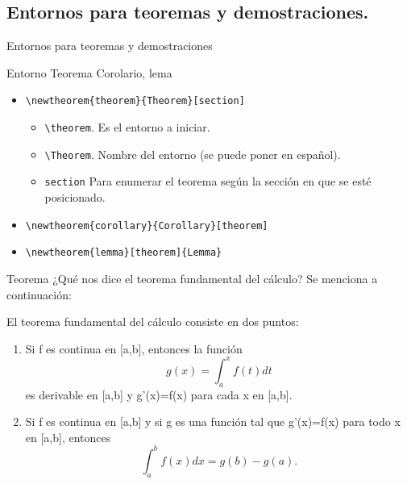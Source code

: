 \documentclass[aspectratio=169, 10pt]{beamer}
\begin{document}
\subsection{Entornos para teoremas y demostraciones.}
\begin{frame}[fragile]{Entornos para teoremas y demostraciones}

\begin{block}{Entorno Teorema Corolario, lema}

    \begin{itemize}
        \item \verb|\newtheorem{theorem}{Theorem}[section]|
        \begin{itemize}
            \item \verb|\theorem|. Es el entorno a iniciar.
            \item \verb|\Theorem|. Nombre del entorno (se puede poner en español).
            \item \verb|section| Para enumerar el teorema según la sección en que se esté posicionado.
        \end{itemize}
        \item \verb|\newtheorem{corollary}{Corollary}[theorem]|
        \item \verb|\newtheorem{lemma}[theorem]{Lemma}|
    \end{itemize}
\end{block}

\end{frame}


\begin{frame}{Teorema}
¿Qué nos dice el teorema fundamental del cálculo? Se menciona a continuación: 

\begin{theorem}
    El teorema fundamental del cálculo consiste en dos puntos: 
    \begin{enumerate}
        \item Si f es continua en [a,b], entonces la función 
        \begin{equation}
            g(x)=\int_{a}^{x}f(t)dt
        \end{equation} 
         es derivable en [a,b] y g'(x)=f(x) para cada x en [a,b].
        
        \item Si f es continua en [a,b] y si g es una función tal que g'(x)=f(x) para todo x en [a,b], entonces
        \begin{equation}
            \int_{a}^{b}f(x)dx=g(b)-g(a).
        \end{equation}
   \end{enumerate} 
\end{theorem}
\end{frame}
\end{document}
